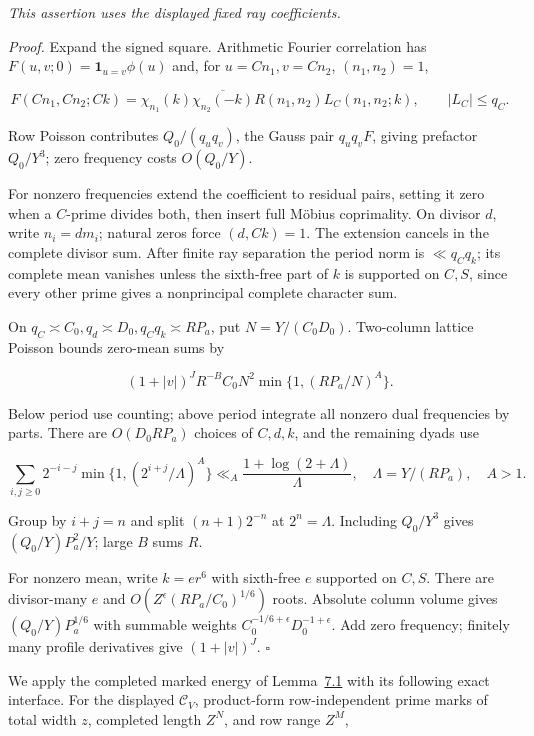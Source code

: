 \emph{This assertion uses the displayed fixed ray coefficients.}

\emph{Proof.} Expand the signed square. Arithmetic Fourier correlation has \(F(u,v;0)=\mathbf1_{u=v}\phi(u)\) and, for \(u=Cn_1,v=Cn_2\), \((n_1,n_2)=1\),

\[
F(Cn_1,Cn_2;Ck)=\chi_{n_1}(k)\overline{\chi_{n_2}(-k)}
 R(n_1,n_2)L_C(n_1,n_2;k),\qquad |L_C|\le q_C.
\]

Row Poisson contributes \(Q_0/(q_uq_v)\), the Gauss pair \(q_uq_vF\), giving prefactor \(Q_0/Y^3\); zero frequency costs \(O(Q_0/Y)\).

For nonzero frequencies extend the coefficient to residual pairs, setting it zero when a \(C\)-prime divides both, then insert full Möbius coprimality. On divisor \(d\), write \(n_i=dm_i\); natural zeros force \((d,Ck)=1\). The extension cancels in the complete divisor sum. After finite ray separation the period norm is \(\ll q_Cq_k\); its complete mean vanishes unless the sixth-free part of \(k\) is supported on \(C,S\), since every other prime gives a nonprincipal complete character sum.

On \(q_C\asymp C_0,q_d\asymp D_0,q_Cq_k\asymp RP_a\), put \(N=Y/(C_0D_0)\). Two-column lattice Poisson bounds zero-mean sums by

\[
(1+|v|)^J R^{-B}C_0N^2
           \min\{1,(RP_a/N)^A\}.
\]

Below period use counting; above period integrate all nonzero dual frequencies by parts. There are \(O(D_0RP_a)\) choices of \(C,d,k\), and the remaining dyads use

\[
\sum_{i,j\ge0}2^{-i-j}\min\{1,(2^{i+j}/\Lambda)^A\}
 \ll_A\frac{1+\log(2+\Lambda)}\Lambda,\quad
 \Lambda=Y/(RP_a),\quad A>1.
\]

Group by \(i+j=n\) and split \((n+1)2^{-n}\) at \(2^n=\Lambda\). Including \(Q_0/Y^3\) gives \((Q_0/Y)P_a^2/Y\); large \(B\) sums \(R\).

For nonzero mean, write \(k=er^6\) with sixth-free \(e\) supported on \(C,S\). There are divisor-many \(e\) and \(O(Z^\epsilon(RP_a/C_0)^{1/6})\) roots. Absolute column volume gives \((Q_0/Y)P_a^{1/6}\) with summable weights \(C_0^{-1/6+\epsilon}D_0^{-1+\epsilon}\). Add zero frequency; finitely many profile derivatives give \((1+|v|)^J\). \(\square\)

We apply the completed marked energy of Lemma~\protect\hyperlink{mf:marked-energy}{7.1} with its following exact interface. For the displayed \(\mathcal C_V\), product-form row-independent prime marks of total width \(z\), completed length \(Z^N\), and row range \(Z^M\),

